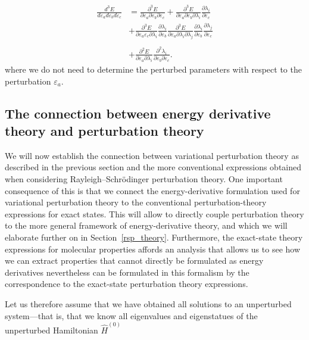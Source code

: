\documentclass[%
 reprint,
 amsmath,amssymb,
 aps,
]{revtex4-1}
\begin{document}
\begin{align}
\frac{d^{3}E}{d\varepsilon_ad\varepsilon_bd\varepsilon_c} & =
\frac{\partial^{3}E}{\partial\varepsilon_a\partial\varepsilon_b\partial\varepsilon_c}+\frac{\partial^{3}E}{\partial\varepsilon_a\partial\varepsilon_b\partial\lambda_{i}}\frac{\partial\lambda_{i}}{\partial\varepsilon_c}
\\ & \nonumber + \frac{\partial^{3}E}{\partial\varepsilon_a\varepsilon_c\partial\lambda_{i}}\frac{\partial\lambda_{i}}{\partial\varepsilon_b}
\frac{\partial^{3}E}{\partial\varepsilon_a\partial\lambda_{i}\partial\lambda_{j}}\frac{\partial\lambda_{i}}{\partial\varepsilon_b}\frac{\partial\lambda_{j}}{\partial\varepsilon_c}\\\nonumber\\&+
\frac{\partial^{2}E}{\partial\varepsilon_a\partial\lambda_{i}}\frac{\partial^{2}\lambda_{i}}{\partial\varepsilon_b\partial\varepsilon_c}.
\end{align}
where we do not need to determine the perturbed parameters with
respect to the perturbation $\varepsilon_a$.

\subsection{The connection between energy derivative theory and
  perturbation theory}

We will now establish the connection between variational perturbation theory as
described in the previous section and the more conventional
expressions obtained when considering Rayleigh--Schrödinger
perturbation theory. One important consequence of this is that we
connect the energy-derivative formulation used for variational
perturbation theory to the conventional perturbation-theory
expressions for exact states. This will allow to directly couple
perturbation theory to the more general framework of energy-derivative
theory, and which we will elaborate further on in
Section~\ref{rsp_theory}. Furthermore, the exact-state theory
expressions for molecular properties affords an analysis that allows
us to see how we can extract properties that cannot directly be
formulated as energy derivatives nevertheless can be formulated in
this formalism by the correspondence to the exact-state perturbation
theory expressions.

Let us therefore assume that we have obtained all solutions to an
unperturbed system---that is, that we know all eigenvalues and
eigenstatues of the unperturbed Hamiltonian $\hat{H}^{(0)}$
\end{document}

